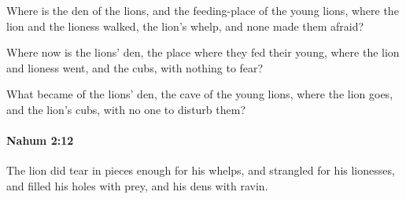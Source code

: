 			\begin{versebox}
					\item[BHS] 
					\item[LXX] 
					\item[ASV] Where is the den of the lions, and the feeding-place of the young lions, where the lion and the lioness walked, the lion's whelp, and none made them afraid?
					\item[NIV] Where now is the lions’ den, the place where they fed their young, where the lion and lioness went, and the cubs, with nothing to fear?
					\item[NRSV] What became of the lions’ den, the cave of the young lions, where the lion goes, and the lion’s cubs, with no one to disturb them?
			\end{versebox}

		\paragraph{Nahum 2:12} %
			\label{NAHUM-2-12}

			The lion did tear in pieces enough for his whelps, and strangled for his lionesses, and filled his holes with prey, and his dens with ravin.

